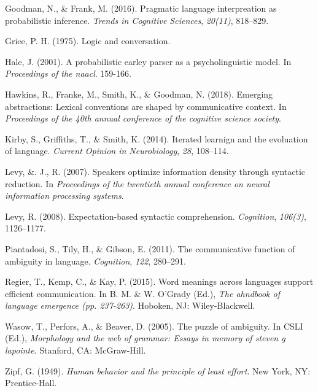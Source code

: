 \documentclass[10pt, letterpaper]{article}
\begin{document}
\hypertarget{ref-GoodmanFrank2016a}{}
Goodman, N., \& Frank, M. (2016). Pragmatic language interpreation as
probabilistic inference. \emph{Trends in Cognitive Sciences},
\emph{20(11)}, 818--829.

\hypertarget{ref-Grice1975a}{}
Grice, P. H. (1975). Logic and conversation.

\hypertarget{ref-Hale2001a}{}
Hale, J. (2001). A probabilistic earley parser as a psycholinguistic
model. In \emph{Proceedings of the naacl}. 159-166.

\hypertarget{ref-HawkinsFrankeSmithGoodman2018a}{}
Hawkins, R., Franke, M., Smith, K., \& Goodman, N. (2018). Emerging
abstractions: Lexical conventions are shaped by communicative context.
In \emph{Proceedings of the 40th annual conference of the cognitive
science society}.

\hypertarget{ref-KirbyGriffithsSmith2014a}{}
Kirby, S., Griffiths, T., \& Smith, K. (2014). Iterated learnign and the
evoluation of language. \emph{Current Opinion in Neurobiology},
\emph{28}, 108--114.

\hypertarget{ref-LevyJaeger2007a}{}
Levy, \&. J., R. (2007). Speakers optimize information density through
syntactic reduction. In \emph{Proceedings of the twentieth annual
conference on neural information processing systems}.

\hypertarget{ref-Levy2008a}{}
Levy, R. (2008). Expectation-based syntactic comprehension.
\emph{Cognition}, \emph{106(3)}, 1126--1177.

\hypertarget{ref-Piantadosi2011a}{}
Piantadosi, S., Tily, H., \& Gibson, E. (2011). The communicative
function of ambiguity in language. \emph{Cognition}, \emph{122},
280--291.

\hypertarget{ref-RegierKempKay2015a}{}
Regier, T., Kemp, C., \& Kay, P. (2015). Word meanings across languages
support efficient communication. In B. M. \& W. O'Grady (Ed.), \emph{The
ahndbook of language emergence (pp. 237-263)}. Hoboken, NJ:
Wiley-Blackwell.

\hypertarget{ref-WasowPerforsBeaver2005a}{}
Wasow, T., Perfors, A., \& Beaver, D. (2005). The puzzle of ambiguity.
In CSLI (Ed.), \emph{Morphology and the web of grammar: Essays in memory
of steven g lapointe}. Stanford, CA: McGraw-Hill.

\hypertarget{ref-Zipf1949a}{}
Zipf, G. (1949). \emph{Human behavior and the principle of least
effort}. New York, NY: Prentice-Hall.


\end{document}
